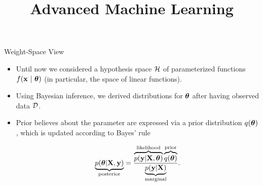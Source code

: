 \documentclass[11pt,compress,t,notes=noshow, xcolor=table]{beamer}
\title{Advanced Machine Learning}
\date{}
\begin{document}


\begin{vbframe}{Weight-Space View}

\begin{itemize}
  \item Until now we considered a hypothesis space $\mathcal{H}$ of parameterized functions $f(\mathbf{x} ~|~ \bm{\theta})$ (in particular, the space of linear functions). 
  \item Using Bayesian inference, we derived distributions for $\bm{\theta}$ after having observed data $\mathcal{D}$. 
  \item Prior believes about the parameter are expressed via a prior distribution $q(\bm{\theta})$, which is updated according to Bayes' rule 

  $$
  \underbrace{p(\bm{\theta} | \mathbf{X}, \mathbf{y})}_{\text{posterior}} = \frac{\overbrace{p(\mathbf{y} | \mathbf{X}, \bm{\theta})}^{\text{likelihood}}\overbrace{q(\bm{\theta})}^{\text{prior}}}{\underbrace{p(\mathbf{y}|\mathbf{X})}_{\text{marginal}}}. 
  $$
\end{itemize}

\end{vbframe}
\end{document}
